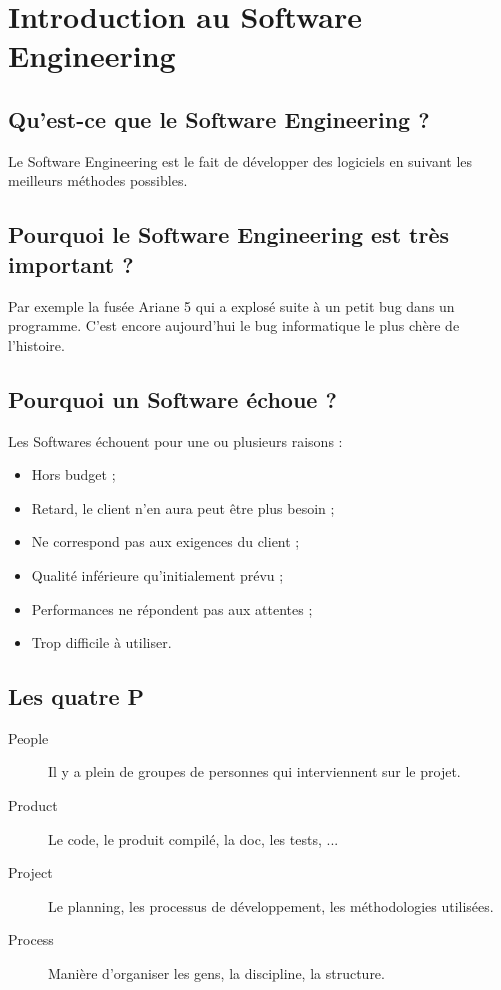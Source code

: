 \section{Introduction au Software Engineering}



\subsection{Qu'est-ce que le Software Engineering ?}
Le Software Engineering est le fait de développer des logiciels en suivant les meilleurs méthodes possibles.



\subsection{Pourquoi le Software Engineering est très important ?}
Par exemple la fusée Ariane 5 qui a explosé suite à un petit bug dans un programme. C'est encore aujourd'hui le bug informatique le plus chère de l'histoire.



\subsection{Pourquoi un Software échoue ?}
Les Softwares échouent pour une ou plusieurs raisons :
\begin{itemize}
    \item Hors budget ;
    \item Retard, le client n'en aura peut être plus besoin ;
    \item Ne correspond pas aux exigences du client ;
    \item Qualité inférieure qu'initialement prévu ;
    \item Performances ne répondent pas aux attentes ;
    \item Trop difficile à utiliser.
\end{itemize}



\subsection{Les quatre P}
\begin{description}
    \item [People] Il y a plein de groupes de personnes qui interviennent sur le projet.
    \item [Product] Le code, le produit compilé, la doc, les tests, ...
    \item [Project] Le planning, les processus de développement, les méthodologies utilisées.
    \item [Process] Manière d'organiser les gens, la discipline, la structure.
\end{description}



